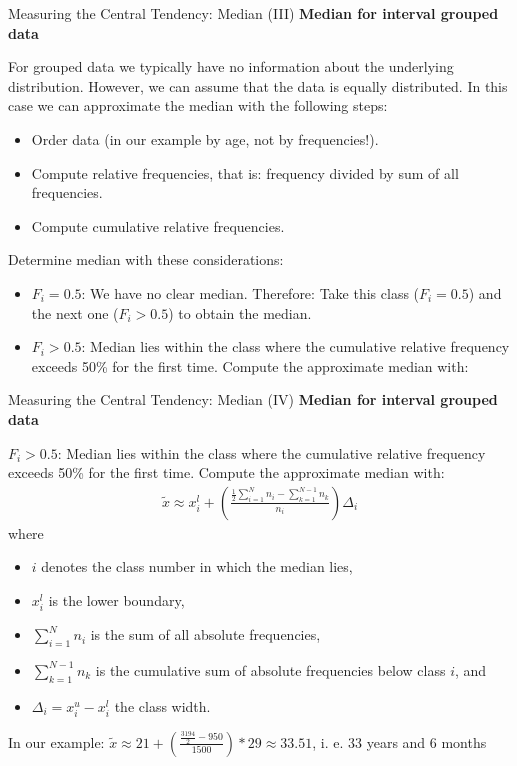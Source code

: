 \begin{frame}{Measuring the Central Tendency: Median (III)}
	\textbf{Median for interval grouped data}

	For grouped data we typically have no information about the underlying
	distribution. However, we can assume that the data is equally
	distributed. In this case we can approximate the median with the following
	steps:
	\begin{itemize}
		\item Order data (in our example by age, not by frequencies!).
		\item Compute relative frequencies, that is: frequency divided by sum of all frequencies.
		\item Compute cumulative relative frequencies.
	\end{itemize}

	Determine median with these considerations:
	\begin{itemize}
		\item $F_i=0.5$: We have no clear median. Therefore: Take this class ($F_i=0.5$) and the next one ($F_i > 0.5$) to obtain the median.
		\item $F_i>0.5$: Median lies within the class where the cumulative
		      relative frequency exceeds 50\% for the first time. Compute the approximate median with:
	\end{itemize}
\end{frame}

\begin{frame}{Measuring the Central Tendency: Median (IV)}
	\textbf{Median for interval grouped data}

	$F_i>0.5$: Median lies within the class where the cumulative
	relative frequency exceeds 50\% for the first time. Compute the approximate median with:
	\begin{align*}
		\tilde{x} \approx x_i^l +\left(\frac{\frac{1}{2}\sum_{i=1}^{N}n_i - \sum_{k=1}^{N-1} n_k}{n_i}\right)\Delta_i
	\end{align*}
	where
	\begin{itemize}
		\item $i$ denotes the class number in which the median lies,
		\item $x_i^l$ is the lower boundary,
		\item $\sum_{i=1}^{N}n_i$ is the sum of all absolute frequencies,
		\item $\sum_{k=1}^{N-1} n_k$ is the cumulative sum of absolute frequencies below class $i$, and
		\item $\Delta_i=x_i^u - x_i^l$ the class width.
	\end{itemize}

	In our example: $\tilde{x} \approx 21 +\left(\frac{\frac{3194}{2} - 950}{1500}\right)*29 \approx 33.51$, i. e. 33 years and 6 months
\end{frame}

